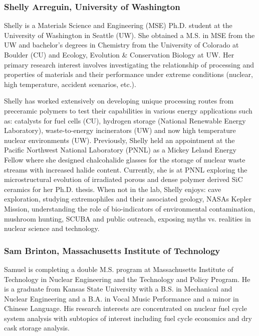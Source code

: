 \subsubsection*{Shelly Arreguin, University of Washington}

Shelly is a Materials Science and Engineering (MSE) Ph.D. student at the
University of Washington in Seattle (UW). She obtained a M.S. in MSE from the UW
and bachelor's degrees in Chemistry from the University of Colorado at Boulder
(CU) and Ecology, Evolution \& Conservation Biology at UW. Her primary research
interest involves investigating the relationship of processing and properties of
materials and their performance under extreme conditions (nuclear, high
temperature, accident scenarios, etc.).

Shelly has worked extensively on developing unique processing routes from
preceramic polymers to test their capabilities in various energy applications
such as: catalysts for fuel cells (CU), hydrogen storage (National Renewable
Energy Laboratory), waste-to-energy incinerators (UW) and now high temperature
nuclear environments (UW). Previously, Shelly held an appointment at the Pacific
Northwest National Laboratory (PNNL) as a Mickey Leland Energy Fellow where she
designed chalcohalide glasses for the storage of nuclear waste streams with
increased halide content. Currently, she is at PNNL exploring the
microstructural evolution of irradiated porous and dense polymer derived SiC
ceramics for her Ph.D. thesis. When not in the lab, Shelly enjoys: cave
exploration, studying extremophiles and their associated geology, NASAs Kepler
Mission, understanding the role of bio-indicators of environmental
contamination, mushroom hunting, SCUBA and public outreach, exposing myths
vs. realities in nuclear science and technology.

\subsubsection*{Sam Brinton, Massachusetts Institute of Technology}

Samuel is completing a double M.S. program at Massachusetts Institute of
Technology in Nuclear Engineering and the Technology and Policy Program. He is a
graduate from Kansas State University with a B.S. in Mechanical and Nuclear
Engineering and a B.A. in Vocal Music Performance and a minor in Chinese
Language. His research interests are concentrated on nuclear fuel cycle system
analysis with subtopics of interest including fuel cycle economics and dry cask
storage analysis.

